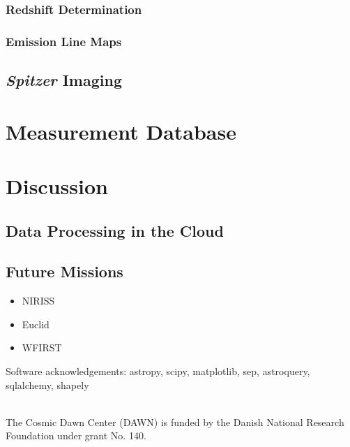 \documentclass[twocolumn]{aastex63}
\begin{document}
\subsubsection{Redshift Determination}
\label{s:redshift}

\subsubsection{Emission Line Maps}
\label{s:linemaps}

\subsection{\textit{Spitzer} Imaging}
\label{s:spitzer}

\section{Measurement Database}
\label{s:database}

\section{Discussion}
\label{s:discussion}

\subsection{Data Processing in the Cloud}
\label{s:cloud}

\subsection{Future Missions}
\label{s:future}

\begin{itemize}
    \item NIRISS
    \item Euclid
    \item WFIRST
\end{itemize}


\acknowledgments

Software acknowledgements: astropy, scipy, matplotlib, sep, astroquery, sqlalchemy, shapely

\\ The Cosmic Dawn Center (DAWN) is funded by the Danish National Research Foundation under grant No. 140. 
\end{document}
